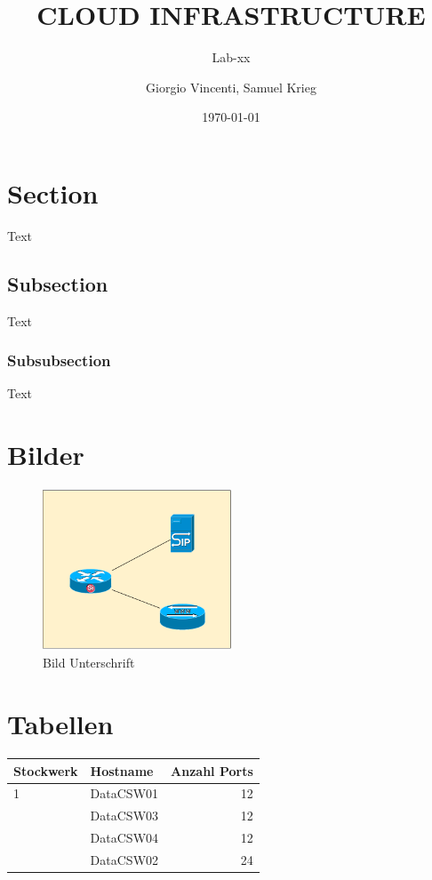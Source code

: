 \documentclass[a4paper,10pt]{scrartcl}
\title{CLOUD INFRASTRUCTURE}
\subtitle{Lab-xx}
\author{Giorgio Vincenti, Samuel Krieg}
\date{\today}
\begin{document}
\maketitle
\tableofcontents
\newpage

\section{Section}
Text

\subsection{Subsection}
Text

\subsubsection{Subsubsection}
Text

\section{Bilder}
\begin{figure} [h]
\begin{center}
\includegraphics[width=0.50\textwidth]{./pictures/sample_picture.pdf}
\caption{Bild Unterschrift}
\label{Bild Referenz}
\end{center}
\end{figure}

\section{Tabellen}
\begin{center}
    \begin{tabular}{@{} l l r@{}}\toprule    
    {Stockwerk} & {Hostname} & {Anzahl Ports}\\ \midrule
    1 & DataCSW01 & 12\\ \addlinespace
    & DataCSW03 & 12\\ \addlinespace
    & DataCSW04 & 12\\ \addlinespace
    2& DataCSW02 & 24\\
    \bottomrule
    \end{tabular}
\end{center}
\end{document}
